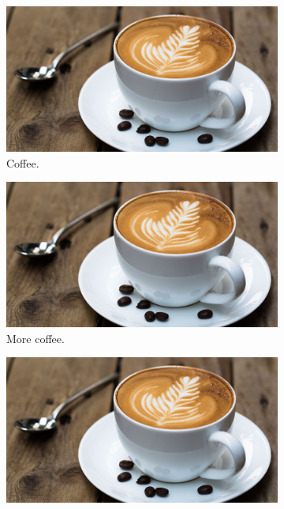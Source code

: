 \documentclass{article}
\begin{document}
\begin{figure}[h!]
  \centering
  \begin{subfigure}[b]{0.2\linewidth}
    \includegraphics[width=\linewidth]{coffee.jpg}
     \caption{Coffee.}
  \end{subfigure}
  \begin{subfigure}[b]{0.2\linewidth}
    \includegraphics[width=\linewidth]{coffee.jpg}
    \caption{More coffee.}
  \end{subfigure}
  \begin{subfigure}[b]{0.2\linewidth}
    \includegraphics[width=\linewidth]{coffee.jpg}

\end{subfigure}
\end{figure}
\end{document}
